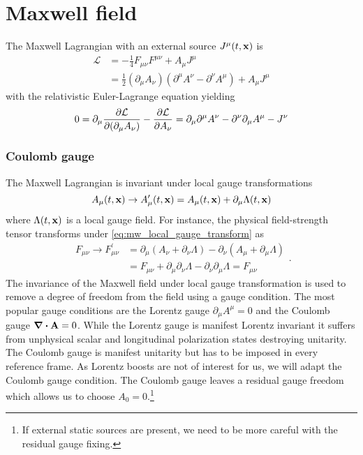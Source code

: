 \section{Maxwell field}

The Maxwell Lagrangian with an external source $J^\mu(t,\vb{x})$ is
\begin{equation}
	\begin{split}
		\mathcal{L}
		&=
		-
		\frac{1}{4}
		F_{\mu\nu}
		F^{\mu\nu}
		+
		A_\mu J^\mu
		\\
		&=
		\frac{1}{2}
		\left(\partial_\mu A_\nu\right)
		\left(\partial^\mu A^\nu-\partial^\nu A^\mu\right)
		+
		A_\mu J^\mu
	\end{split}
	\label{eq:mw_lagrangian}
\end{equation}
with the relativistic Euler-Lagrange equation yielding
\begin{equation}
	0
	=
	\partial_\mu\pdv{\mathcal{L}}{(\partial_\mu A_\nu)}
	-
	\pdv{\mathcal{L}}{A_\nu}
	=
	\partial_\mu\partial^\mu A^\nu
	-
	\partial^\nu\partial_\mu A^\mu
	-
	J^\nu	
	\label{eq:mw_eom}	
\end{equation}

\subsubsection{Coulomb gauge}

The Maxwell Lagrangian is invariant under local gauge transformations
\begin{equation}
	A_\mu(t,\vb{x})
	\to
	A_\mu^\prime(t,\vb{x})
	=
	A_\mu(t,\vb{x})
	+
	\partial_\mu\Lambda(t,\vb{x})
	\label{eq:mw_local_gauge_transform}
\end{equation}
where $\Lambda(t,\vb{x})$ is a local gauge field.
For instance, the physical field-strength tensor transforms under \cref{eq:mw_local_gauge_transform} as
\begin{equation}
	\begin{split}
		F_{\mu\nu}
		\to
		F_{\mu\nu}^\prime
		&=
		\partial_\mu\left(A_\nu+\partial_\nu\Lambda\right)
		-
		\partial_\nu\left(A_\mu+\partial_\mu\Lambda\right)
		\\
		&=
		F_{\mu\nu}
		+
		\partial_\mu\partial_\nu\Lambda
		-
		\partial_\nu\partial_\mu\Lambda
		=
		F_{\mu\nu}
	\end{split}
	\label{eq:mw_field_strength_gauge_transform}.
\end{equation}
The invariance of the Maxwell field under local gauge transformation is used to remove a degree of freedom from the field using a gauge condition.
The most popular gauge conditions are the Lorentz gauge $\partial_\mu A^\mu=0$ and the Coulomb gauge $\div\vb{A}=0$.
While the Lorentz gauge is manifest Lorentz invariant it suffers from unphysical scalar and longitudinal polarization states destroying unitarity.
The Coulomb gauge is manifest unitarity but has to be imposed in every reference frame.
As Lorentz boosts are not of interest for us, we will adapt the Coulomb gauge condition.
The Coulomb gauge leaves a residual gauge freedom which allows us to choose $A_0=0$.\footnote{If external static sources are present, we need to be more careful with the residual gauge fixing.}

